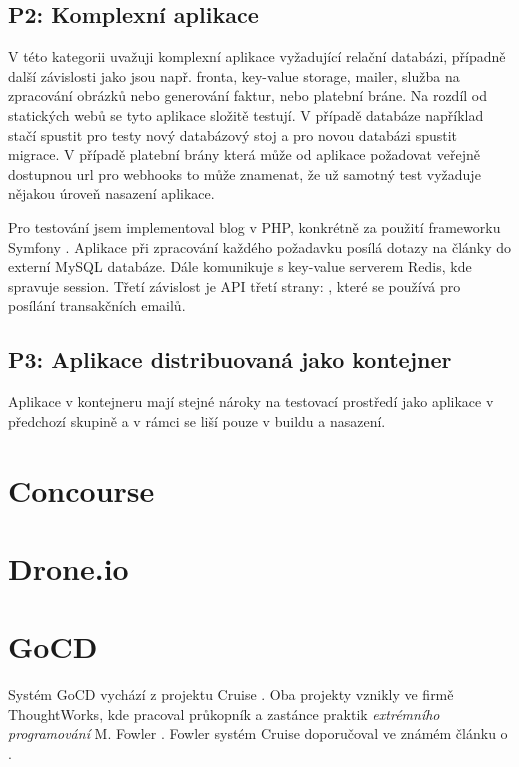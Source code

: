         \subsection{P2: Komplexní aplikace}
            V této kategorii uvažuji komplexní aplikace vyžadující relační databázi, případně další závislosti jako jsou např. fronta, key-value storage, mailer, služba na zpracování obrázků nebo generování faktur, nebo platební bráne. Na rozdíl od statických webů se tyto aplikace složitě testují. V případě databáze například stačí spustit pro testy nový databázový stoj a pro novou databázi spustit migrace. V případě platební brány která může od aplikace požadovat veřejně dostupnou url pro webhooks to může znamenat, že už samotný test vyžaduje nějakou úroveň nasazení aplikace. 

            Pro testování jsem implementoval blog v PHP, konkrétně za použití frameworku Symfony \cite{symfony}. Aplikace při zpracování každého požadavku posílá dotazy na články do externí MySQL databáze. Dále komunikuje s key-value serverem Redis, kde spravuje session. Třetí závislost je API třetí strany: , které se používá pro posílání transakčních emailů.


        \subsection{P3: Aplikace distribuovaná jako kontejner}
            Aplikace v kontejneru mají stejné nároky na testovací prostředí jako aplikace v předchozí skupině a v rámci \CICD se liší pouze v buildu a nasazení.

            \blind[1]

    

    

    \section{Concourse}
    \section{Drone.io}

    \section{GoCD}
        Systém GoCD vychází z projektu Cruise \cite{thoughtworks-gocd}. Oba projekty vznikly ve firmě ThoughtWorks, kde pracoval průkopník a zastánce praktik \textit{extrémního programování} M. Fowler \cite{fowler-go}. Fowler systém Cruise doporučoval ve známém článku o \CI \cite{fowler-ci}.

